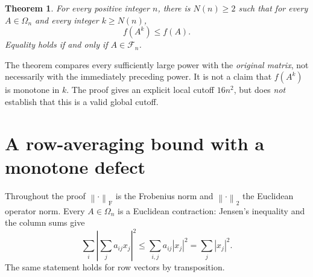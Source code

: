 \documentclass[11pt]{article}
\newtheorem{theorem}{Theorem}[section]
\theoremstyle{remark}\newtheorem{remark}[theorem]{Remark}
\newcommand{\Om}{\Omega_n}
\newcommand{\Fset}{\mathcal F_n}
\newcommand{\fn}[1]{\left\|#1\right\|_{\mathrm F}}
\newcommand{\op}[1]{\left\|#1\right\|_{2}}
\begin{document}
\begin{theorem}\label{thm:main}
For every positive integer $n$, there is $N(n)\ge2$ such that for every
$A\in\Om$ and every integer $k\ge N(n)$,
\[
 f(A^k)\le f(A).
\]
Equality holds if and only if $A\in\Fset$.
\end{theorem}

The theorem compares every sufficiently large power with the
\emph{original matrix}, not necessarily with the immediately preceding
power. It is not a claim that $f(A^k)$ is monotone in $k$. The proof gives
an explicit local cutoff $16n^2$, but does \emph{not} establish that this
is a valid global cutoff.

\section{A row-averaging bound with a monotone defect}
Throughout the proof $\fn{\cdot}$ is the Frobenius norm and
$\op{\cdot}$ the Euclidean operator norm. Every $A\in\Om$ is a
Euclidean contraction: Jensen's inequality and the column sums give
\[
 \sum_i\left|\sum_j a_{ij}x_j\right|^2
 \le\sum_{i,j}a_{ij}|x_j|^2=\sum_j|x_j|^2.
\]
The same statement holds for row vectors by transposition.
\end{document}
